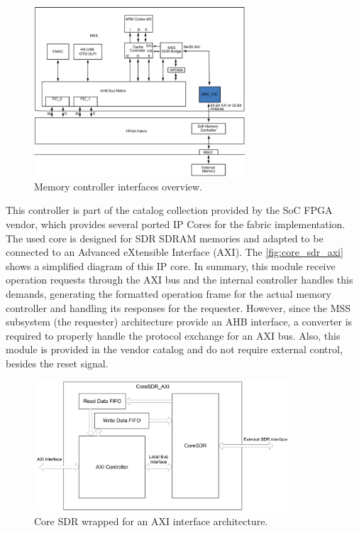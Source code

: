 \begin{figure}[!ht]
    \begin{center}
        \includegraphics[width=0.7\textwidth]{figures/hpdma.png}
        \caption{Memory controller interfaces overview.}
        \label{fig:hpdma}
    \end{center}
\end{figure}

This controller is part of the catalog collection provided by the SoC FPGA vendor, which provides several ported IP Cores for the fabric implementation. The used core is designed for SDR SDRAM memories and adapted to be connected to an Advanced eXtensible Interface (AXI). The \autoref{fig:core_sdr_axi} shows a simplified diagram of this IP core. In summary, this module receive operation requests through the AXI bus and the internal controller handles this demands, generating the formatted operation frame for the actual memory controller and handling its responses for the requester. However, since the MSS subsystem (the requester) architecture provide an AHB interface, a converter is required to properly handle the protocol exchange for an AXI bus. Also, this module is provided in the vendor catalog and do not require external control, besides the reset signal.

\begin{figure}[!ht]
    \begin{center}
        \includegraphics[width=0.85\textwidth]{figures/core_sdr_axi.png}
        \caption{Core SDR wrapped for an AXI interface architecture.}
        \label{fig:core_sdr_axi}
    \end{center}
\end{figure}


